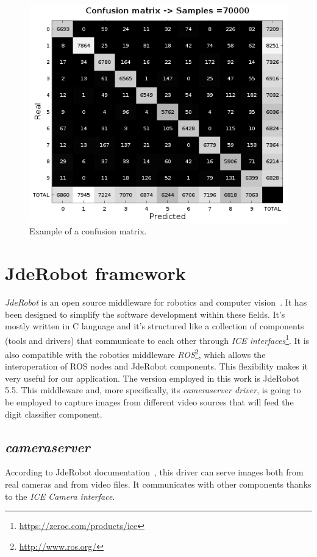 \begin{figure}
	\centering
	\includegraphics[width=0.8\linewidth, keepaspectratio]{figures/conf_mat.png}
	\caption{Example of a confusion matrix.}
	\label{fig:conf_mat}
\end{figure}

\section{JdeRobot framework}\label{sec:jderobot}
\emph{JdeRobot} is an open source middleware for robotics and computer vision~\cite{jderobot}. It has been designed to simplify the software development within these fields. It's mostly written in C\nolinebreak[4]\hspace{-.05em}\raisebox{.4ex}{\tiny\bf ++} language and it's structured like a collection of components (tools and drivers) that communicate to each other through \emph{ICE interfaces}\footnote{\url{https://zeroc.com/products/ice}}. It is also compatible with the robotics middleware \emph{ROS}\footnote{\url{http://www.ros.org/}}, which allows the interoperation of ROS nodes and JdeRobot components. This flexibility makes it very useful for our application. The version employed in this work is JdeRobot 5.5. This middleware and, more specifically, its \emph{\textit{cameraserver} driver}, is going to be employed to capture images from different video sources that will feed the digit classifier component.

\subsection* {\textit{cameraserver}}
According to JdeRobot documentation~\cite{jderobot}, this driver can serve images both from real cameras and from video files. It communicates with other components thanks to the \emph{ICE \textit{Camera} interface}.

